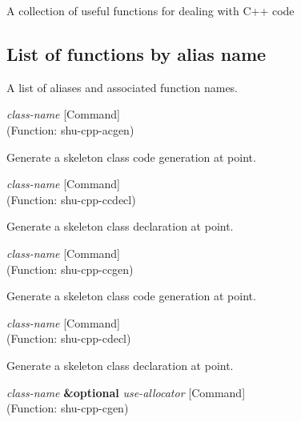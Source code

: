 A collection of useful functions for dealing with C++ code


\subsection{List of functions by alias name}

A list of aliases and associated function names.



\vspace{1em}
\noindent
{}
\usebox{\funcname}\emph{class-name}
 \hfill [Command]\\%
 (Function: shu-cpp-acgen)

\begin{doc-string}
Generate a skeleton class code generation at point.
\end{doc-string}

\vspace{1em}
\noindent
{}
\usebox{\funcname}\emph{class-name}
 \hfill [Command]\\%
 (Function: shu-cpp-ccdecl)

\begin{doc-string}
Generate a skeleton class declaration at point.
\end{doc-string}

\vspace{1em}
\noindent
{}
\usebox{\funcname}\emph{class-name}
 \hfill [Command]\\%
 (Function: shu-cpp-ccgen)

\begin{doc-string}
Generate a skeleton class code generation at point.
\end{doc-string}

\vspace{1em}
\noindent
{}
\usebox{\funcname}\emph{class-name}
 \hfill [Command]\\%
 (Function: shu-cpp-cdecl)

\begin{doc-string}
Generate a skeleton class declaration at point.
\end{doc-string}

\vspace{1em}
\noindent
{}
\usebox{\funcname}\emph{class-name} \textbf{\&optional} \emph{use-allocator}
 \hfill [Command]\\%
 (Function: shu-cpp-cgen)


